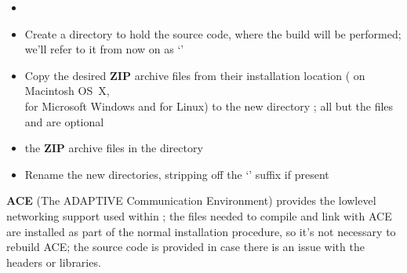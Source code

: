 \tertiaryEnd
{}
\begin{itemize}
\item\TBD
\end{itemize}
\tertiaryEnd
\secondaryEnd
{}
\begin{itemize}
\item Create a directory to hold the source code, where the build will be performed; we'll
refer to it from now on as `'
\item\exSp{}Copy the desired \textbf{ZIP} archive files from their installation location
( on Macintosh OS~X,\\
 for
Microsoft Windows and \TBD{} for Linux) to the new directory ; all
but the files  and
are optional
\item\exSp{} the \textbf{ZIP} archive files in the directory
\item\exSp{}Rename the new directories, stripping off the `' suffix if
present
\end{itemize}
\secondaryEnd
{}
\textbf{ACE} (The ADAPTIVE Communication Environment) provides the low\longDash{}level
networking support used within \mplusm{}; the files needed to compile and link with ACE
are installed as part of the normal \mplusm{} installation procedure, so it's not
necessary to rebuild ACE; the source code is provided in case there is an issue with the
headers or libraries.\\

